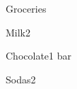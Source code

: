 



\begin{checklist}{Groceries}
  \item{Milk}{2}
  \item{Chocolate}{1 bar}
  \item{Sodas}{2}
\end{checklist}


